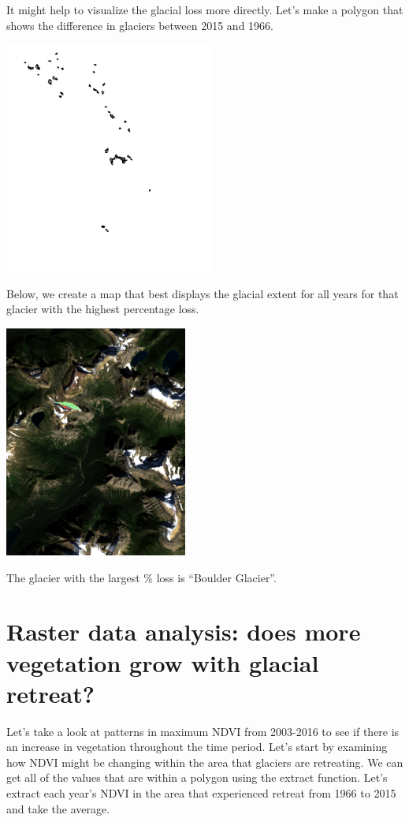 \documentclass[11pt]{article}
\begin{document}
It might help to visualize the glacial loss more directly. Let’s make a polygon that shows the difference in glaciers between 2015 and 1966.

\begin{center}
\includegraphics[height=3in]{q5_cont.png}
\end{center}

Below, we create a map that best displays the glacial extent for all years for that glacier with the highest percentage loss.

\begin{center}
\includegraphics[height=3in]{q6_alt2.png}
\end{center}

The glacier with the largest \% loss is “Boulder Glacier”.

\section*{Raster data analysis: does more vegetation grow with glacial retreat?}

Let’s take a look at patterns in maximum NDVI from 2003-2016 to see if there is an increase in vegetation throughout the time period. Let’s start by examining how NDVI might be changing within the area that glaciers are retreating. We can get all of the values that are within a polygon using the extract function. Let’s extract each year’s NDVI in the area that experienced retreat from 1966 to 2015 and take the average.\\
\end{document}
